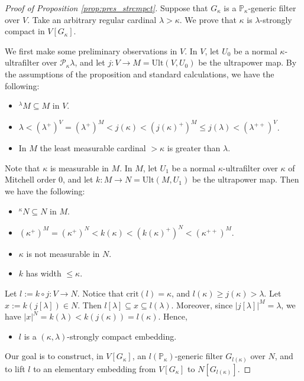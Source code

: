 \documentclass[a4paper,12pt,reqno,oneside]{amsart}
\theoremstyle{plain}
\newcommand{\mrm}{\mathrm}
\newcommand{\mbb}{\mathbb}
\newcommand{\mcal}{\mathcal}
\begin{document}
\begin{proof}[Proof of Proposition \ref{prop:pres_strcmpct}]
Suppose that $G_\kappa$ is a $\mbb{P}_\kappa$-generic filter over $V$. Take an arbitrary regular cardinal $\lambda > \kappa$. We prove that $\kappa$ is $\lambda$-strongly compact in $V[ G_\kappa ]$.

We first make some preliminary observations in $V$. In $V$, let $U_0$ be a normal $\kappa$-ultrafilter over $\mcal{P}_\kappa \lambda$, and let $j : V \to M = \mrm{Ult} ( V , U_0 )$ be the ultrapower map. By the assumptions of the proposition and standard calculations, we have the following:
\begin{itemize}
\item[(i)] ${}^\lambda M \subseteq M$ in $V$.
\item[(ii)] $\lambda < ( \lambda^+ )^V = ( \lambda^+ )^M < j( \kappa ) < ( j( \kappa )^+ )^M \leq j( \lambda ) < ( \lambda^{++} )^V$.
\item[(iii)] In $M$ the least measurable cardinal $> \kappa$ is greater than $\lambda$.
\end{itemize}
Note that $\kappa$ is measurable in $M$. In $M$, let $U_1$ be a normal $\kappa$-ultrafilter over $\kappa$ of Mitchell order $0$, and let $k : M \to N = \mrm{Ult} ( M , U_1 )$ be the ultrapower map. Then we have the following:
\begin{itemize}
\item[(iv)] ${}^\kappa N \subseteq N$ in $M$.
\item[(v)] $( \kappa^+ )^M = ( \kappa^+ )^N < k( \kappa ) < ( k( \kappa )^+ )^N < ( \kappa^{++} )^M$.
\item[(vi)] $\kappa$ is not measurable in $N$.
\item[(vii)] $k$ has width $\leq \kappa$.
\end{itemize}
Let $l := k \circ j : V \to N$. Notice that  $\mrm{crit} (l) = \kappa$, and $l( \kappa ) \geq j( \kappa ) > \lambda$. Let $x := k( j[ \lambda ] ) \in N$. Then $l[ \lambda ] \subseteq x \subseteq l( \lambda )$. Moreover, since $| j[ \lambda ] |^M = \lambda$, we have $|x|^N = k( \lambda ) < k( j( \kappa ) ) = l( \kappa )$. Hence, 
\begin{itemize}
\item[(viii)] $l$ is a $( \kappa , \lambda )$-strongly compact embedding.
\end{itemize}


Our goal is to construct, in $V[ G_\kappa ]$, an $l( \mbb{P}_\kappa )$-generic filter $G_{l( \kappa )}$ over $N$,  and to lift $l$ to an elementary embedding from $V[ G_\kappa ]$ to $N[ G_{l( \kappa )} ]$.


\end{proof}
\end{document}
